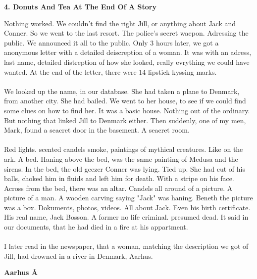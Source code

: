 \documentclass[]{article}
\begin{document}
\newpage

\begin{center}
	\large\textbf{4. Donuts And Tea At The End Of A Story}
\end{center}

Nothing worked. We couldn't find the right Jill, or anything about Jack and Conner. So we went to the last resort. The police's secret waepon. Adressing the public. We announced it all to the public. Only 3 hours later, we got a anonymous letter with a detailed deiscreption of a woman. It was with an adress, last name, detailed distreption of how she looked, really evrything we could have wanted. At the end of the letter, there were 14 lipstick kyssing marks.
\\ \\
We looked up the name, in our database. She had taken a plane to Denmark, from another city. She had bailed. We went to her house, to see if we could find some clues on how to find her. It was a basic house. Nothing out of the ordinary. But nothing that linked Jill to Denmark either. Then suddenly, one of my men, Mark, found a seacret door in the basement. A seacret room. 
\\ \\
Red lights. scented candels smoke, paintings of mythical creatures. Like on the ark. A bed. Haning above the bed, was the same painting of Medusa and the sirens. In the bed, the old geezer Conner was lying. Tied up. She had cut of his balls, choked him in fluids and left him for death. With a stripe on his face. Across from the bed, there was an altar. Candels all around of a picture. A picture of a man. A wooden carving saying "Jack" was haning. Beneth the picture was a box. Dokuments, photos, videos. All about Jack. Even his birth certificate. His real name, Jack Bosson. A former no life criminal. presumed dead. It said in our documents, that he had died in a fire at his appartment.  
\\ \\
I later read in the newspaper, that a woman, matching the description we got of Jill, had drowned in a river in Denmark, Aarhus. 

\newpage

\begin{center}
	\Large\textbf{Aarhus Å}
\end{center}
\end{document}
